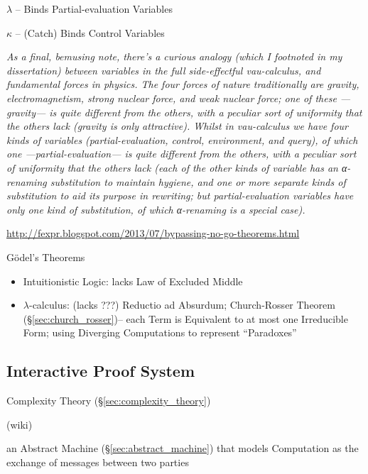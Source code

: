 $\lambda$ -- Binds Partial-evaluation Variables

$\kappa$ -- (Catch) Binds Control Variables

\emph{As a final, bemusing note, there's a curious analogy (which I
  footnoted in my dissertation) between variables in the full
  side-effectful vau-calculus, and fundamental forces in physics. The
  four forces of nature traditionally are gravity, electromagnetism,
  strong nuclear force, and weak nuclear force; one of these —gravity—
  is quite different from the others, with a peculiar sort of
  uniformity that the others lack (gravity is only attractive). Whilst
  in vau-calculus we have four kinds of variables (partial-evaluation,
  control, environment, and query), of which one —partial-evaluation—
  is quite different from the others, with a peculiar sort of
  uniformity that the others lack (each of the other kinds of variable
  has an α-renaming substitution to maintain hygiene, and one or more
  separate kinds of substitution to aid its purpose in rewriting; but
  partial-evaluation variables have only one kind of substitution, of
  which α-renaming is a special case).}


\url{http://fexpr.blogspot.com/2013/07/bypassing-no-go-theorems.html}

G\"odel's Theorems

\begin{itemize}
\item Intuitionistic Logic: lacks Law of Excluded Middle
\item $\lambda$-calculus: (lacks ???) Reductio ad Absurdum;
  Church-Rosser Theorem (\S\ref{sec:church_rosser})-- each Term is
  Equivalent to at most one Irreducible Form; using
  Diverging Computations to represent ``Paradoxes''
\end{itemize}



\subsection{Interactive Proof System}\label{sec:interactive_proof}

\fist Complexity Theory (\S\ref{sec:complexity_theory})

(wiki)

an Abstract Machine (\S\ref{sec:abstract_machine}) that models Computation as
the exchange of messages between two parties

